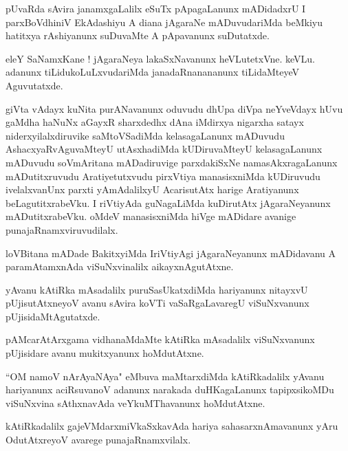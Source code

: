\documentclass{article}
\begin{document}
\begin{mn}%
pUvaRda sAvira janamxgaLalilx eSuTx pApagaLanunx mADidadxrU I parxBoVdhiniV EkAdashiyu A diana 
jAgaraNe mADuvudariMda beMkiyu hatitxya rAshiyanunx suDuvaMte A pApavanunx suDutatxde.
\end{mn}

\begin{mn}%
eleY SaNamxKane ! jAgaraNeya lakaSxNavanunx heVLutetxVne. keVLu. adanunx tiLidukoLuLxvudariMda 
janadaRnanananunx tiLidaMteyeV Aguvutatxde.
\end{mn}

\begin{mn}%
giVta vAdayx kuNita purANavanunx oduvudu dhUpa diVpa neYveVdayx hUvu gaMdha haNuNx aGayxR 
sharxdedhx dAna iMdirxya nigarxha  satayx niderxyilalxdiruvike saMtoVSadiMda kelasagaLanunx 
mADuvudu AshacxyaRvAguvaMteyU utAsxhadiMda kUDiruvaMteyU kelasagaLanunx mADuvudu soVmAritana 
mADadiruvige parxdakiSxNe namasAkxragaLanunx mADutitxruvudu Aratiyetutxvudu pirxVtiya 
manasisxniMda kUDiruvudu ivelalxvanUnx parxti yAmAdalilxyU AcarisutAtx harige Aratiyanunx 
beLagutitxrabeVku. I riVtiyAda guNagaLiMda kuDirutAtx jAgaraNeyanunx mADutitxrabeVku. oMdeV 
manasisxniMda hiVge mADidare avanige punajaRnamxviruvudilalx.
\end{mn}

\begin{mn}%
loVBitana mADade BakitxyiMda IriVtiyAgi jAgaraNeyanunx mADidavanu A paramAtamxnAda viSuNxvinalilx 
aikayxnAgutAtxne.
\end{mn}

\begin{mn}%
yAvanu kAtiRka mAsadalilx puruSasUkatxdiMda hariyanunx nitayxvU pUjisutAtxneyoV avanu sAvira koVTi 
vaSaRgaLavaregU viSuNxvanunx pUjisidaMtAgutatxde.
\end{mn}

\begin{mn}%
pAMcarAtArxgama vidhanaMdaMte kAtiRka mAsadalilx viSuNxvanunx pUjisidare avanu mukitxyanunx 
hoMdutAtxne.
\end{mn}

\begin{mn}%
``OM namoV nArAyaNAya" eMbuva maMtarxdiMda kAtiRkadalilx yAvanu hariyanunx aciRsuvanoV adanunx 
narakada duHKagaLanunx tapipxsikoMDu viSuNxvina sAthxnavAda veYkuMThavanunx hoMdutAtxne.
\end{mn}

\begin{mn}%
kAtiRkadalilx gajeVMdarxmiVkaSxkavAda hariya sahasarxnAmavanunx yAru OdutAtxreyoV avarege 
punajaRnamxvilalx.
\end{mn}
\end{document}
